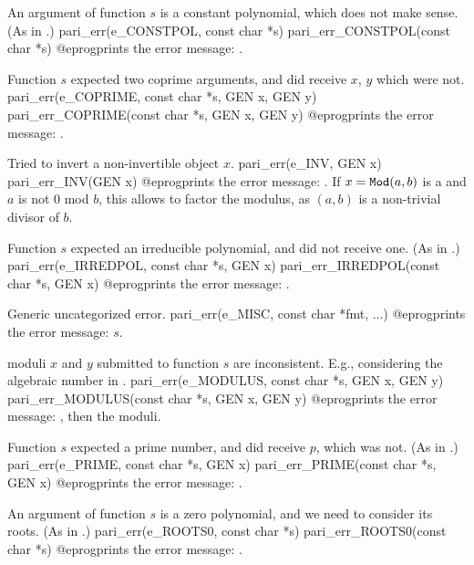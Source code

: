
 An argument of function $s$ is a constant polynomial,
which does not make sense. (As in .)
\bprog
  pari_err(e_CONSTPOL, const char *s)
  pari_err_CONSTPOL(const char *s)
@eprog\noindent prints the error message: .

 Function $s$ expected two coprime arguments, and did
receive $x$, $y$ which were not.
\bprog
  pari_err(e_COPRIME, const char *s, GEN x, GEN y)
  pari_err_COPRIME(const char *s, GEN x, GEN y)
@eprog\noindent prints the error message: .

 Tried to invert a non-invertible object $x$.
\bprog
  pari_err(e_INV, GEN x)
  pari_err_INV(GEN x)
@eprog\noindent prints the error message: .
If $x = {\tt Mod}(a,b)$ is a  and $a$ is not $0$ mod $b$, this
allows to factor the modulus, as $(a,b)$ is a non-trivial divisor of
$b$.

 Function $s$ expected an irreducible polynomial,
and did not receive one. (As in .)
\bprog
  pari_err(e_IRREDPOL, const char *s, GEN x)
  pari_err_IRREDPOL(const char *s, GEN x)
@eprog\noindent prints the error message: .

 Generic uncategorized error.
\bprog
  pari_err(e_MISC, const char *fmt, ...)
@eprog\noindent prints the error message: $s$.

 moduli $x$ and $y$ submitted to function $s$ are
inconsistent. E.g., considering the algebraic number
 in .
\bprog
  pari_err(e_MODULUS, const char *s, GEN x, GEN y)
  pari_err_MODULUS(const char *s, GEN x, GEN y)
@eprog\noindent prints the error message: ,
then the moduli.

 Function $s$ expected a prime number, and did receive $p$,
which was not. (As in .)
\bprog
  pari_err(e_PRIME, const char *s, GEN x)
  pari_err_PRIME(const char *s, GEN x)
@eprog\noindent prints the error message: .

 An argument of function $s$ is a zero polynomial, and
we need to consider its roots. (As in .)
\bprog
  pari_err(e_ROOTS0, const char *s)
  pari_err_ROOTS0(const char *s)
@eprog\noindent prints the error message: .

